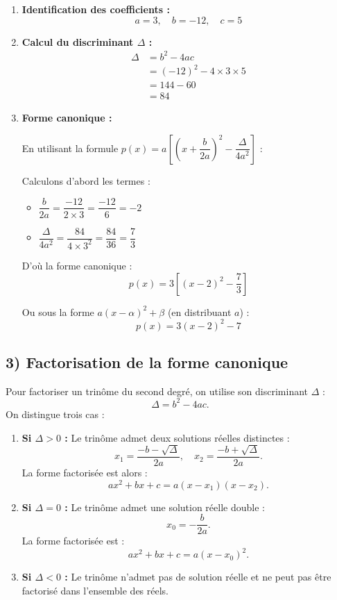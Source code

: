 \documentclass[12pt,a4paper]{article}
\newcounter{solution}
\begin{document}
\begin{enumerate}
    \item \textbf{Identification des coefficients :}
    \[
    a = 3, \quad b = -12, \quad c = 5
    \]

    \item \textbf{Calcul du discriminant $\Delta$ :}
    \begin{equation*}
    \begin{aligned}
    \Delta &= b^2 - 4ac \\
    &= (-12)^2 - 4 \times 3 \times 5 \\
    &= 144 - 60 \\
    &= 84
    \end{aligned}
    \end{equation*}

    \item \textbf{Forme canonique :}
    
    En utilisant la formule $p(x) = a \left[ \left(x + \dfrac{b}{2a}\right)^2 - \dfrac{\Delta}{4a^2} \right]$ :

    Calculons d'abord les termes :
    \begin{itemize}
        \item $\dfrac{b}{2a} = \dfrac{-12}{2 \times 3} = \dfrac{-12}{6} = -2$
        \item $\dfrac{\Delta}{4a^2} = \dfrac{84}{4 \times 3^2} = \dfrac{84}{36} = \dfrac{7}{3}$
    \end{itemize}

    D'où la forme canonique :
    \[
    p(x) = 3 \left[ (x - 2)^2 - \frac{7}{3} \right]
    \]
    
    Ou sous la forme $a(x - \alpha)^2 + \beta$ (en distribuant $a$) :
    \[
    p(x) = 3(x - 2)^2 - 7
    \]
\end{enumerate}


\subsection*{\color{myred} 3) Factorisation de la forme canonique}

Pour factoriser un trinôme du second degré, on utilise son discriminant \( \Delta \) :
\[
\Delta = b^2 - 4ac.
\]
On distingue trois cas :

\begin{enumerate}
    \item \textbf{Si \( \Delta > 0 \) :}  
    Le trinôme admet deux solutions réelles distinctes :
    \[
    x_1 = \frac{-b - \sqrt{\Delta}}{2a}, \quad x_2 = \frac{-b + \sqrt{\Delta}}{2a}.
    \]
    La forme factorisée est alors :
    \[
    ax^2 + bx + c = a(x - x_1)(x - x_2).
    \]

    \item \textbf{Si \( \Delta = 0 \) :}  
    Le trinôme admet une solution réelle double :
    \[
    x_0 = -\frac{b}{2a}.
    \]
    La forme factorisée est :
    \[
    ax^2 + bx + c = a(x - x_0)^2.
    \]

    \item \textbf{Si \( \Delta < 0 \) :}  
    Le trinôme n’admet pas de solution réelle et ne peut pas être factorisé dans l’ensemble des réels.
\end{enumerate}
\end{document}
